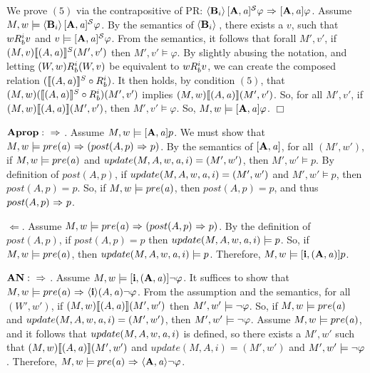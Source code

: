 We prove $(5)$ via the contrapositive of PR: $\langle \mathbf{B}_{i} \rangle\,\mathbf{[A,\mathit{a}]^\mathcal{S}}\varphi {\ \Rightarrow \ } \mathbf{[ A,\mathit{a}]}\varphi$.
Assume $M,w \models \langle \mathbf{B}_{i} \rangle\,\mathbf{[A,\mathit{a}]^\mathcal{S}}\varphi$. By the semantics of $\langle \mathbf{B}_{i} \rangle\,$, there exists a $v$, such that $wR_{b}^i v$ and $v \models \mathbf{[A,\mathit{a}]^\mathcal{S}}\varphi$. From the semantics, it follows that forall $M',v'$, if $(M,v)\llbracket (A,\mathit{a}) \rrbracket^S (M',v')$ then $M',v' \models \varphi$. By slightly abusing the notation, and letting $(W,w)R_{b}^i (W,v)$ be equivalent to $wR_{b}^i v$, we can create the composed relation $(\llbracket (A,\mathit{a}) \rrbracket^S \circ R_{b}^i)$. It then holds, by condition $(5)$, that $(M,w) (\llbracket (A,\mathit{a}) \rrbracket^S \circ R_{b}^i) (M',v')$ implies $(M,w)\llbracket (A,\mathit{a}) \rrbracket (M',v')$. So, for all $M',v'$, if $(M,w)\llbracket (A,\mathit{a}) \rrbracket (M',v')$, then $M',v' \models \varphi$. So, $M,w \models \mathbf{[A,\mathit{a}]}\varphi$. $\Box$

$\mathbf{Aprop: {\ \Rightarrow \ }}$. Assume $M,w \models \mathbf{[A,\mathit{a}]}p$. We must show that $M,w \models pre(\mathit{a}){\ \Rightarrow \ } (post(A,p) {\ \Rightarrow \ } p)$. By the semantics of $\mathbf{[A,\mathit{a}]}$, for all $(M',w')$, if $M,w \models pre(\mathit{a})$ and $update(M,A,w,\mathit{a},i)= (M',w')$, then $M',w' \models p$. By definition of $post(A,p)$, if $update(M,A,w,\mathit{a},i)=(M',w')$ and $M',w' \models p$, then $post(A,p)=p$. So, if $M,w \models pre(\mathit{a})$, then $post(A,p) = p$, and thus $post(A,p){\ \Rightarrow \ } p$. 

$\Leftarrow$. Assume $M,w \models pre(\mathit{a}) {\ \Rightarrow \ } (post(A,p){\ \Rightarrow \ } p)$. By the definition of $post(A,p)$, if $post(A,p)=p$ then $update(M,A,w,\mathit{a},i)\models p$. So, if $M,w \models pre(\mathit{a})$, then $update(M,A,w,\mathit{a},i)\models p$. Therefore, $M,w\models \mathbf{[i,(A,\mathit{a})]}p$.

$\mathbf{AN: {\ \Rightarrow \ }}$. Assume $M,w \models \mathbf{[i,(A,\mathit{a})]}{\neg} \varphi$. It suffices to show that $M,w \models pre(\mathit{a}) {\ \Rightarrow \ } \mathbf{\langle i\rangle}{(A,\mathit{a})}{\neg} \varphi$. From the assumption and the semantics, for all $(W',w')$, if $(M,w)\llbracket (A,\mathit{a}) \rrbracket(M',w')$ then $M',w' \models {\neg} \varphi$. So, if $M,w \models pre(\mathit{a})$ and $update(\\M,A,w,\mathit{a},i)=(M',w')$, then $M',w' \models {\neg} \varphi$. Assume $M,w \models pre(\mathit{a})$, and it follows that $update(M,A,w,\mathit{a},i)$ is defined, so there exists a $M',w'$ such that $(M,w)\llbracket (A,\mathit{a}) \rrbracket(M',w')$ and $update(M,A,i)=(M',w')$ and $M',w' \models {\neg} \varphi$. Therefore, $M,w \models pre(\mathit{a}) {\ \Rightarrow \ } \mathbf{\langle A,\mathit{a}\rangle}{\neg} \varphi$.

